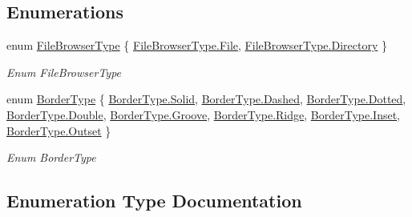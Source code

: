 \subsection*{Enumerations}
\begin{DoxyCompactItemize}
\item 
enum \hyperlink{namespace_lerp2_a_p_i_1_1_utility_af5d628470963cc0f18c37055b4170bf1}{File\+Browser\+Type} \{ \hyperlink{namespace_lerp2_a_p_i_1_1_utility_af5d628470963cc0f18c37055b4170bf1a0b27918290ff5323bea1e3b78a9cf04e}{File\+Browser\+Type.\+File}, 
\hyperlink{namespace_lerp2_a_p_i_1_1_utility_af5d628470963cc0f18c37055b4170bf1ae73cda510e8bb947f7e61089e5581494}{File\+Browser\+Type.\+Directory}
 \}\begin{DoxyCompactList}\small\item\em Enum File\+Browser\+Type \end{DoxyCompactList}
\item 
enum \hyperlink{namespace_lerp2_a_p_i_1_1_utility_a8046e09472382edc5b740291a380c94c}{Border\+Type} \{ \newline
\hyperlink{namespace_lerp2_a_p_i_1_1_utility_a8046e09472382edc5b740291a380c94cae41480b6bbfbf7407974a88d3d34f4fa}{Border\+Type.\+Solid}, 
\hyperlink{namespace_lerp2_a_p_i_1_1_utility_a8046e09472382edc5b740291a380c94caeb656e41b6da91494775ecf47a51da91}{Border\+Type.\+Dashed}, 
\hyperlink{namespace_lerp2_a_p_i_1_1_utility_a8046e09472382edc5b740291a380c94ca90c09393a4c0970bc9a6703ad527781c}{Border\+Type.\+Dotted}, 
\hyperlink{namespace_lerp2_a_p_i_1_1_utility_a8046e09472382edc5b740291a380c94cad909d38d705ce75386dd86e611a82f5b}{Border\+Type.\+Double}, 
\newline
\hyperlink{namespace_lerp2_a_p_i_1_1_utility_a8046e09472382edc5b740291a380c94caa5d7f2d1b78f9222563004a41a616334}{Border\+Type.\+Groove}, 
\hyperlink{namespace_lerp2_a_p_i_1_1_utility_a8046e09472382edc5b740291a380c94cae9eeca48aa5cccacde08760c6ec9dd5a}{Border\+Type.\+Ridge}, 
\hyperlink{namespace_lerp2_a_p_i_1_1_utility_a8046e09472382edc5b740291a380c94cab56d315e49178ba86341ff3b4e337c6b}{Border\+Type.\+Inset}, 
\hyperlink{namespace_lerp2_a_p_i_1_1_utility_a8046e09472382edc5b740291a380c94ca5e9fb94d2ec46e6f829196c229e2b194}{Border\+Type.\+Outset}
 \}\begin{DoxyCompactList}\small\item\em Enum Border\+Type \end{DoxyCompactList}
\end{DoxyCompactItemize}


\subsection{Enumeration Type Documentation}
\mbox{\label{namespace_lerp2_a_p_i_1_1_utility_a8046e09472382edc5b740291a380c94c}} 

